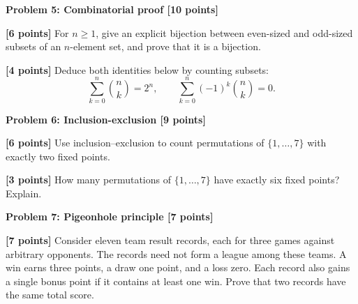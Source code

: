 \documentclass[12pt,letterpaper]{article}
\newcommand{\problemheading}[2][5\baselineskip]{\Needspace{#1}\par\noindent\hspace*{-0.625in}\textbf{#2}\par\nobreak\vspace{0.3em}}
\newcommand{\examspace}[1]{\par\vspace*{#1cm}}
\begin{document}
\problemheading{Problem 5: Combinatorial proof [10 points]}
\begin{list}{}{\setlength{\leftmargin}{0.25in}\setlength{\rightmargin}{0.25in}}\item[]
\begin{description}[font=\normalfont,leftmargin=1.2em,labelsep=0.4em]
\item[(a)] \textbf{[6 points]} For $n\ge1$, give an explicit bijection between even-sized and odd-sized subsets of an $n$-element set, and prove that it is a bijection.
\examspace{4}
\Needspace{\dimexpr 3cm+4\baselineskip\relax}
\item[(b)] \textbf{[4 points]} Deduce both identities below by counting subsets:\[\sum_{k=0}^{n}\binom nk=2^n,\qquad \sum_{k=0}^{n}(-1)^k\binom nk=0.\]
\examspace{3}
\end{description}
\end{list}
\clearpage
\vspace*{0.21in}
\problemheading{Problem 6: Inclusion-exclusion [9 points]}
\begin{list}{}{\setlength{\leftmargin}{0.25in}\setlength{\rightmargin}{0.25in}}\item[]
\begin{description}[font=\normalfont,leftmargin=1.2em,labelsep=0.4em]
\item[(a)] \textbf{[6 points]} Use inclusion--exclusion to count permutations of $\{1,\ldots,7\}$ with exactly two fixed points.
\examspace{5}
\Needspace{\dimexpr 3cm+4\baselineskip\relax}
\item[(b)] \textbf{[3 points]} How many permutations of $\{1,\ldots,7\}$ have exactly six fixed points? Explain.
\examspace{3}
\end{description}
\end{list}
\clearpage
\vspace*{0.21in}
\problemheading{Problem 7: Pigeonhole principle [7 points]}
\begin{list}{}{\setlength{\leftmargin}{0.25in}\setlength{\rightmargin}{0.25in}}\item[]
\begin{description}[font=\normalfont,leftmargin=1.2em,labelsep=0.4em]
\item[] \textbf{[7 points]} Consider eleven team result records, each for three games against arbitrary opponents. The records need not form a league among these teams. A win earns three points, a draw one point, and a loss zero. Each record also gains a single bonus point if it contains at least one win. Prove that two records have the same total score.
\examspace{7}
\end{description}
\end{list}
\end{document}
